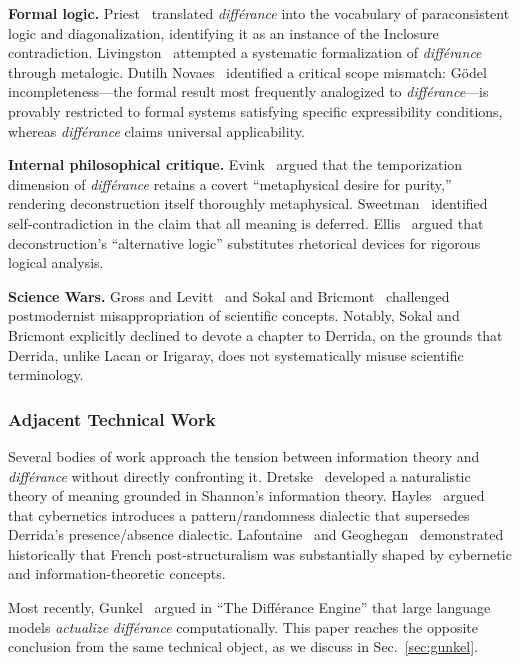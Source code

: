 \documentclass[a4paper,twocolumn,11pt]{article}
\begin{document}
\textbf{Formal logic.} Priest~\cite{Priest2002} translated \emph{diff\'erance} into the vocabulary of paraconsistent logic and diagonalization, identifying it as an instance of the Inclosure contradiction. Livingston~\cite{Livingston2010} attempted a systematic formalization of \emph{diff\'erance} through metalogic. Dutilh Novaes~\cite{DutilhNovaes2012} identified a critical scope mismatch: G\"odel incompleteness---the formal result most frequently analogized to \emph{diff\'erance}---is provably restricted to formal systems satisfying specific expressibility conditions, whereas \emph{diff\'erance} claims universal applicability.

\textbf{Internal philosophical critique.} Evink~\cite{Evink2020} argued that the temporization dimension of \emph{diff\'erance} retains a covert ``metaphysical desire for purity,'' rendering deconstruction itself thoroughly metaphysical. Sweetman~\cite{Sweetman1999} identified self-contradiction in the claim that all meaning is deferred. Ellis~\cite{Ellis1989} argued that deconstruction's ``alternative logic'' substitutes rhetorical devices for rigorous logical analysis.

\textbf{Science Wars.} Gross and Levitt~\cite{GrossLevitt1994} and Sokal and Bricmont~\cite{SokalBricmont1998} challenged postmodernist misappropriation of scientific concepts. Notably, Sokal and Bricmont explicitly declined to devote a chapter to Derrida, on the grounds that Derrida, unlike Lacan or Irigaray, does not systematically misuse scientific terminology.

\subsubsection{Adjacent Technical Work}

Several bodies of work approach the tension between information theory and \emph{diff\'erance} without directly confronting it. Dretske~\cite{Dretske1981} developed a naturalistic theory of meaning grounded in Shannon's information theory. Hayles~\cite{Hayles1999} argued that cybernetics introduces a pattern/randomness dialectic that supersedes Derrida's presence/absence dialectic. Lafontaine~\cite{Lafontaine2007} and Geoghegan~\cite{Geoghegan2023} demonstrated historically that French post-structuralism was substantially shaped by cybernetic and information-theoretic concepts.

Most recently, Gunkel~\cite{Gunkel2025} argued in ``The Diff\'erance Engine'' that large language models \emph{actualize} \emph{diff\'erance} computationally. This paper reaches the opposite conclusion from the same technical object, as we discuss in Sec.~\ref{sec:gunkel}.
\end{document}
